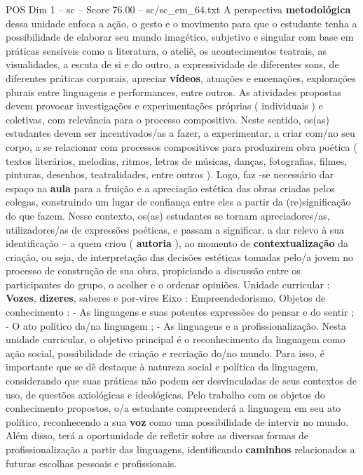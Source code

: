 \begin{textsample}{POS Dim 1 – sc – Score 76.00 – sc/sc\_em\_64.txt}
A perspectiva \textbf{metodológica} dessa unidade enfoca a ação, o gesto e o movimento para que o estudante tenha a possibilidade de elaborar seu mundo imagético, subjetivo e singular com base em práticas sensíveis como a literatura, o ateliê, os acontecimentos teatrais, as visualidades, a escuta de si e do outro, a expressividade de diferentes sons, de diferentes práticas corporais, apreciar \textbf{vídeos}, atuações e encenações, explorações plurais entre linguagens e performances, entre outros.
As atividades propostas devem provocar investigações e experimentações próprias ( individuais ) e coletivas, com relevância para o processo compositivo.
Neste sentido, os(as) estudantes devem ser incentivados/as a fazer, a experimentar, a criar com/no seu corpo, a se relacionar com processos compositivos para produzirem obra poética ( textos literários, melodias, ritmos, letras de músicas, danças, fotografias, filmes, pinturas, desenhos, teatralidades, entre outros ).
Logo, faz -se necessário dar espaço na \textbf{aula} para a fruição e a apreciação estética das obras criadas pelos colegas, construindo um lugar de confiança entre eles a partir da (re)significação do que fazem.
Nesse contexto, os(as) estudantes se tornam apreciadores/as, utilizadores/as de expressões poéticas, e passam a significar, a dar relevo à sua identificação – a quem criou ( \textbf{autoria} ), ao momento de \textbf{contextualização} da criação, ou seja, de interpretação das decisões estéticas tomadas pelo/a jovem no processo de construção de sua obra, propiciando a discussão entre os participantes do grupo, o acolher e o ordenar opiniões.
Unidade curricular : \textbf{Vozes}, \textbf{dizeres}, saberes e por-vires Eixo : Empreendedorismo.
Objetos de conhecimento : - As linguagens e suas potentes expressões do pensar e do sentir ; - O ato político da/na linguagem ; - As linguagens e a profissionalização.
Nesta unidade curricular, o objetivo principal é o reconhecimento da linguagem como ação social, possibilidade de criação e recriação do/no mundo.
Para isso, é importante que se dê destaque à natureza social e política da linguagem, considerando que suas práticas não podem ser desvinculadas de seus contextos de uso, de questões axiológicas e ideológicas.
Pelo trabalho com os objetos do conhecimento propostos, o/a estudante compreenderá a linguagem em seu ato político, reconhecendo a sua \textbf{voz} como uma possibilidade de intervir no mundo.
Além disso, terá a oportunidade de refletir sobre as diversas formas de profissionalização a partir das linguagens, identificando \textbf{caminhos} relacionados a futuras escolhas pessoais e profissionais.

\end{textsample}
